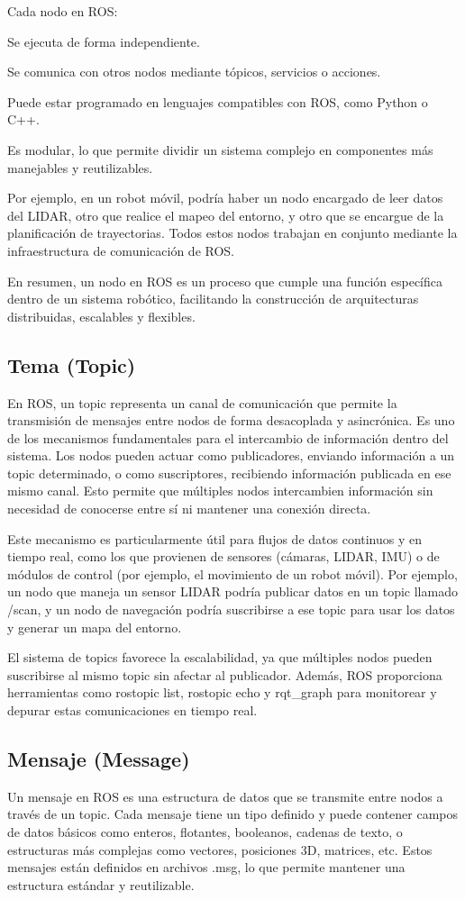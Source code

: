 Cada nodo en ROS:

Se ejecuta de forma independiente.

Se comunica con otros nodos mediante tópicos, servicios o acciones.

Puede estar programado en lenguajes compatibles con ROS, como Python o C++.

Es modular, lo que permite dividir un sistema complejo en componentes más manejables y reutilizables.

Por ejemplo, en un robot móvil, podría haber un nodo encargado de leer datos del LIDAR, otro que realice el mapeo del entorno, y otro que se encargue de la planificación de trayectorias. Todos estos nodos trabajan en conjunto mediante la infraestructura de comunicación de ROS.

En resumen, un nodo en ROS es un proceso que cumple una función específica dentro de un sistema robótico, facilitando la construcción de arquitecturas distribuidas, escalables y flexibles.

\subsection{Tema (Topic)}
En ROS, un topic representa un canal de comunicación que permite la transmisión de mensajes entre nodos de forma desacoplada y asincrónica. Es uno de los mecanismos fundamentales para el intercambio de información dentro del sistema. Los nodos pueden actuar como publicadores, enviando información a un topic determinado, o como suscriptores, recibiendo información publicada en ese mismo canal. Esto permite que múltiples nodos intercambien información sin necesidad de conocerse entre sí ni mantener una conexión directa.

Este mecanismo es particularmente útil para flujos de datos continuos y en tiempo real, como los que provienen de sensores (cámaras, LIDAR, IMU) o de módulos de control (por ejemplo, el movimiento de un robot móvil). Por ejemplo, un nodo que maneja un sensor LIDAR podría publicar datos en un topic llamado /scan, y un nodo de navegación podría suscribirse a ese topic para usar los datos y generar un mapa del entorno.

El sistema de topics favorece la escalabilidad, ya que múltiples nodos pueden suscribirse al mismo topic sin afectar al publicador. Además, ROS proporciona herramientas como rostopic list, rostopic echo y rqt_graph para monitorear y depurar estas comunicaciones en tiempo real.

\subsection{Mensaje (Message)}
Un mensaje en ROS es una estructura de datos que se transmite entre nodos a través de un topic. Cada mensaje tiene un tipo definido y puede contener campos de datos básicos como enteros, flotantes, booleanos, cadenas de texto, o estructuras más complejas como vectores, posiciones 3D, matrices, etc. Estos mensajes están definidos en archivos .msg, lo que permite mantener una estructura estándar y reutilizable.

